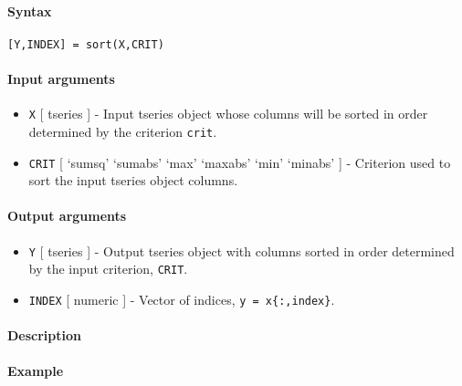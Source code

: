 


	\paragraph{Syntax}

\begin{verbatim}
[Y,INDEX] = sort(X,CRIT)
\end{verbatim}

\paragraph{Input arguments}

\begin{itemize}
\item
  \texttt{X} {[} tseries {]} - Input tseries object whose columns will
  be sorted in order determined by the criterion \texttt{crit}.
\item
  \texttt{CRIT} {[} `sumsq' \textbar{} `sumabs' \textbar{} `max'
  \textbar{} `maxabs' \textbar{} `min' \textbar{} `minabs' {]} -
  Criterion used to sort the input tseries object columns.
\end{itemize}

\paragraph{Output arguments}

\begin{itemize}
\item
  \texttt{Y} {[} tseries {]} - Output tseries object with columns sorted
  in order determined by the input criterion, \texttt{CRIT}.
\item
  \texttt{INDEX} {[} numeric {]} - Vector of indices,
  \texttt{y = x\{:,index\}}.
\end{itemize}

\paragraph{Description}

\paragraph{Example}


